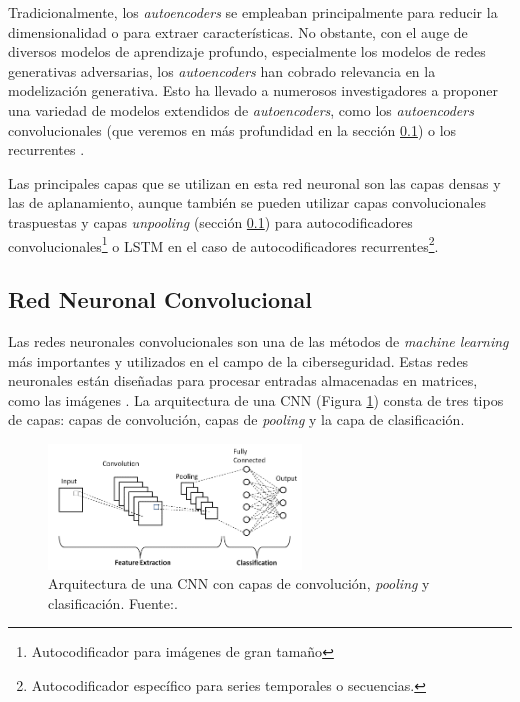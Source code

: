 Tradicionalmente, los \textit{autoencoders} se empleaban principalmente para reducir la dimensionalidad o para extraer características. No obstante, con el auge de diversos modelos de aprendizaje profundo, especialmente los modelos de redes generativas adversarias, los \textit{autoencoders} han cobrado relevancia en la modelización generativa. Esto ha llevado a numerosos investigadores a proponer una variedad de modelos extendidos de \textit{autoencoders}, como los \textit{autoencoders} convolucionales (que veremos en más profundidad en la sección \ref{sec:2.CNN}) o los recurrentes \citep{zhai2018autoencoder}. 

Las principales capas que se utilizan en esta red neuronal son las capas densas y las de aplanamiento, aunque también se pueden utilizar capas convolucionales traspuestas y capas \textit{unpooling} (sección \ref{sec:2.CNN}) para autocodificadores convolucionales\footnote{Autocodificador para imágenes de gran tamaño} o LSTM en el caso de autocodificadores recurrentes\footnote{Autocodificador específico para series temporales o secuencias.}\citep{geron2022hands}. 

\subsection{Red Neuronal Convolucional} \label{sec:2.CNN}


Las redes neuronales convolucionales son una de las métodos de \textit{machine learning} más importantes y utilizados en el campo de la ciberseguridad. Estas redes neuronales están diseñadas para procesar entradas almacenadas en matrices, como las imágenes \citep{podder2021artificial}. La arquitectura de una CNN (Figura \ref{fig:cnn_architecture}) consta de tres tipos de capas: capas de convolución, capas de \textit{pooling} y la capa de clasificación. 
 

\begin{figure}[h]
    \centering
    \includegraphics[width=0.6\textwidth]{img/convlayers.png}
    \caption{Arquitectura de una CNN con capas de convolución, \textit{pooling} y clasificación. Fuente:\citep{phung2018deep}.}
    \label{fig:cnn_architecture}
\end{figure}

